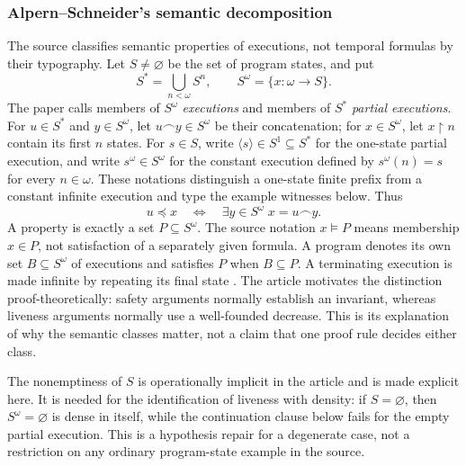 \subsubsection{Alpern--Schneider's semantic decomposition}

The source classifies semantic properties of executions, not temporal formulas
by their typography.  Let \(S\neq\varnothing\) be the set of program states,
and put
\[
 S^*=\bigcup_{n<\omega}S^n,
 \qquad
 S^\omega=\{x:\omega\to S\}.
\]
The paper calls members of \(S^\omega\) \emph{executions} and members of
\(S^*\) \emph{partial executions}.  For \(u\in S^*\) and
\(y\in S^\omega\), let
\(u\mathbin{\smallfrown}y\in S^\omega\) be their concatenation; for
\(x\in S^\omega\), let \(x{\upharpoonright}n\) contain its first \(n\)
states.  For \(s\in S\), write \(\langle s\rangle\in S^1\subseteq S^*\)
for the one-state partial execution, and write \(s^\omega\in S^\omega\) for
the constant execution defined by \(s^\omega(n)=s\) for every
\(n\in\omega\).  These notations distinguish a one-state finite prefix from
a constant infinite execution and type the example witnesses below.  Thus
\[
 u\preceq x
 \quad\Longleftrightarrow\quad
 \exists y\in S^\omega\;
 x=u\mathbin{\smallfrown}y.
\]
A property is exactly a set \(P\subseteq S^\omega\).  The source notation
\(x\models P\) means membership \(x\in P\), not satisfaction of a separately
given formula.  A program denotes its own set \(B\subseteq S^\omega\) of
executions and satisfies \(P\) when \(B\subseteq P\).  A terminating execution
is made infinite by repeating its final state
\cite[p.~181]{AlpernSchneider1985}.
The article motivates the distinction proof-theoretically: safety arguments
normally establish an invariant, whereas liveness arguments normally use a
well-founded decrease.  This is its explanation of why the semantic classes
matter, not a claim that one proof rule decides either class.

The nonemptiness of \(S\) is operationally implicit in the article and is made
explicit here.  It is needed for the identification of liveness with density:
if \(S=\varnothing\), then \(S^\omega=\varnothing\) is dense in itself, while
the continuation clause below fails for the empty partial execution.  This is
a hypothesis repair for a degenerate case, not a restriction on any ordinary
program-state example in the source.

